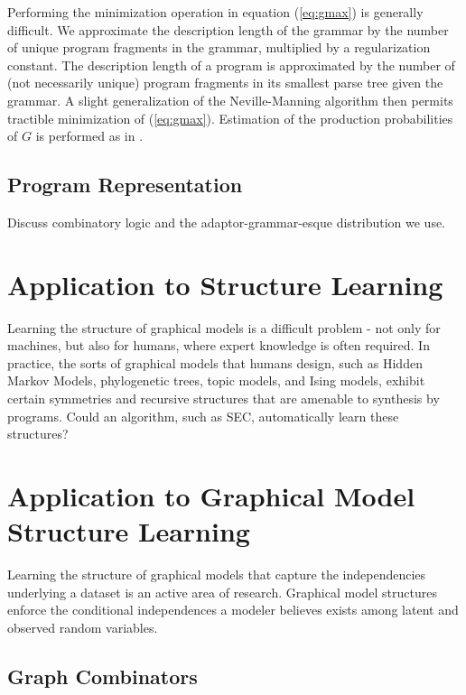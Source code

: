 \documentclass{article} %
\begin{document}
Performing the minimization operation in equation (\ref{eq:gmax}) is generally difficult.
We approximate the description length of the grammar by the number of unique program fragments in the grammar, multiplied by a regularization constant.
The description length of a program is approximated by the number of (not necessarily unique) program fragments in its smallest parse tree given the grammar.
A slight generalization of the Neville-Manning algorithm then permits tractible minimization of (\ref{eq:gmax}).
Estimation of the production probabilities of $G$ is performed as in \cite{ijcai}.

\subsection{Program Representation}
Discuss combinatory logic and the adaptor-grammar-esque distribution we use.

\section{Application to Structure Learning}
Learning the structure of graphical models is a difficult problem - not only for machines, but also for humans, where expert knowledge is often required.
In practice, the sorts of graphical models that humans design, such as Hidden Markov Models, phylogenetic trees, topic models, and Ising models, exhibit certain symmetries and recursive structures that are amenable to synthesis by programs.
Could an algorithm, such as SEC, automatically learn these structures?

\section{Application to Graphical Model Structure Learning}

Learning the structure of graphical models that capture the independencies underlying a dataset is an active area of research\cite{adams-wallach-ghahramani-2010a}\cite{ISI:000240797500002}\cite{ISI:000178037200004}\cite{ISI:A1995RX35400001}. Graphical model structures enforce the conditional independences a modeler believes exists among latent and observed random variables\cite{DBLP:books/daglib/0066829}. 

\subsection{Graph Combinators}
\end{document}
